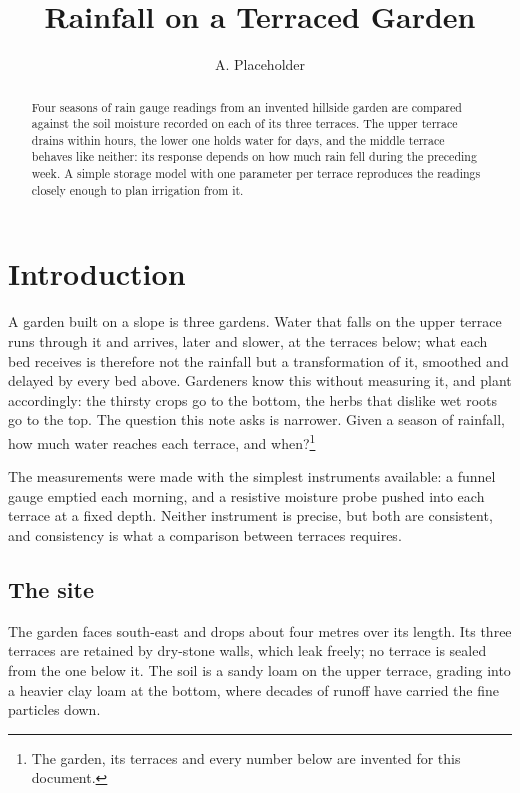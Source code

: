 \documentclass{article}
\title{Rainfall on a Terraced Garden}
\author{A. Placeholder}
\date{}
\begin{document}
\maketitle

\begin{abstract}
Four seasons of rain gauge readings from an invented hillside garden are
compared against the soil moisture recorded on each of its three
terraces. The upper terrace drains within hours, the lower one holds water
for days, and the middle terrace behaves like neither: its response depends
on how much rain fell during the preceding week. A simple storage model
with one parameter per terrace reproduces the readings closely enough to
plan irrigation from it.
\end{abstract}

\section{Introduction}

A garden built on a slope is three gardens. Water that falls on the upper
terrace runs through it and arrives, later and slower, at the terraces
below; what each bed receives is therefore not the rainfall but a
transformation of it, smoothed and delayed by every bed above. Gardeners
know this without measuring it, and plant accordingly: the thirsty crops
go to the bottom, the herbs that dislike wet roots go to the top. The
question this note asks is narrower. Given a season of rainfall, how much
water reaches each terrace, and when?\footnote{The garden, its terraces
and every number below are invented for this document.}

The measurements were made with the simplest instruments available: a
funnel gauge emptied each morning, and a resistive moisture probe pushed
into each terrace at a fixed depth. Neither instrument is precise, but
both are consistent, and consistency is what a comparison between
terraces requires.

\subsection{The site}

The garden faces south-east and drops about four metres over its length.
Its three terraces are retained by dry-stone walls, which leak freely; no
terrace is sealed from the one below it. The soil is a sandy loam on the
upper terrace, grading into a heavier clay loam at the bottom, where
decades of runoff have carried the fine particles down.
\end{document}
